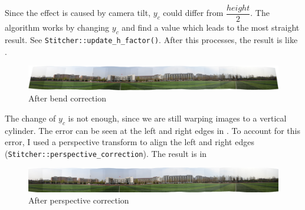 Since the effect is caused by camera tilt, $ y_c$ could differ from $ \dfrac{height}{2}$.
The algorithm works by changing $ y_c$ and find a value which leads to the most straight result. See \verb|Stitcher::update_h_factor()|.
After this processes, the result is like .

\begin{figure}[H]
  \centering
  \includegraphics[width=\textwidth]{res/unbend.jpg}
  \caption{After bend correction\label{fig:unbend}}
\end{figure}

The change of $y_c$ is not enough, since we are still warping
images to a vertical cylinder.
The error can be seen at the left and right edges in .
To account for this error, I used a perspective transform
to align the left and right edges (\verb|Stitcher::perspective_correction|). The result is in 
\begin{figure}[H]
  \centering
  \includegraphics[width=\textwidth]{res/unbend-persp.jpg}
  \caption{After perspective correction \label{fig:unbend-persp}}
\end{figure}

